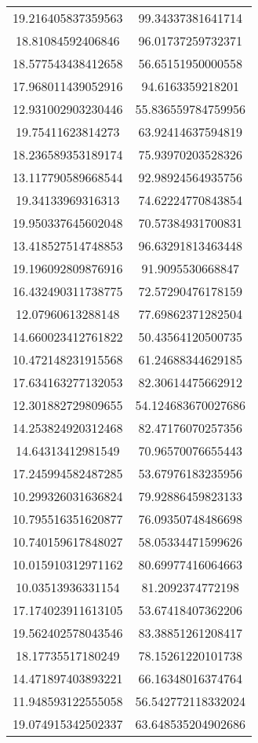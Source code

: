 \begin{table}
\begin{tabular}{cc}
19.216405837359563 & 99.34337381641714 \\
18.81084592406846 & 96.01737259732371 \\
18.577543438412658 & 56.65151950000558 \\
17.968011439052916 & 94.6163359218201 \\
12.931002903230446 & 55.836559784759956 \\
19.75411623814273 & 63.92414637594819 \\
18.236589353189174 & 75.93970203528326 \\
13.117790589668544 & 92.98924564935756 \\
19.34133969316313 & 74.62224770843854 \\
19.950337645602048 & 70.57384931700831 \\
13.418527514748853 & 96.63291813463448 \\
19.196092809876916 & 91.9095530668847 \\
16.432490311738775 & 72.57290476178159 \\
12.07960613288148 & 77.69862371282504 \\
14.660023412761822 & 50.43564120500735 \\
10.472148231915568 & 61.24688344629185 \\
17.634163277132053 & 82.30614475662912 \\
12.301882729809655 & 54.124683670027686 \\
14.253824920312468 & 82.47176070257356 \\
14.64313412981549 & 70.96570076655443 \\
17.245994582487285 & 53.67976183235956 \\
10.299326031636824 & 79.92886459823133 \\
10.795516351620877 & 76.09350748486698 \\
10.740159617848027 & 58.05334471599626 \\
10.015910312971162 & 80.69977416064663 \\
10.03513936331154 & 81.2092374772198 \\
17.174023911613105 & 53.67418407362206 \\
19.562402578043546 & 83.38851261208417 \\
18.17735517180249 & 78.15261220101738 \\
14.471897403893221 & 66.16348016374764 \\
11.948593122555058 & 56.542772118332024 \\
19.074915342502337 & 63.648535204902686 \\

\end{tabular}
\end{table}
